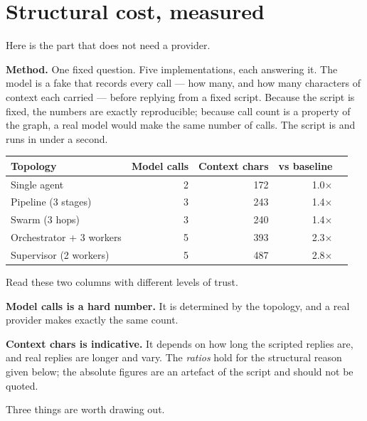 \section{Structural cost, measured}
\label{sec:structural-cost}

Here is the part that does not need a provider.

\textbf{Method.} One fixed question. Five implementations, each answering it. The
model is a fake that records every call --- how many, and how many characters of
context each carried --- before replying from a fixed script. Because the script
is fixed, the numbers are exactly reproducible; because call count is a property
of the graph, a real model would make the same number of calls. The script is
 and runs in under a second.

\begin{center}
\small
\begin{tabularx}{\linewidth}{@{}lrrrX@{}}
\toprule
\textbf{Topology} & \textbf{Model calls} & \textbf{Context chars} & \textbf{vs baseline} \\
\midrule
Single agent & 2 & 172 & 1.0$\times$ \\
Pipeline (3 stages) & 3 & 243 & 1.4$\times$ \\
Swarm (3 hops) & 3 & 240 & 1.4$\times$ \\
Orchestrator + 3 workers & 5 & 393 & 2.3$\times$ \\
Supervisor (2 workers) & 5 & 487 & 2.8$\times$ \\
\bottomrule
\end{tabularx}
\end{center}

\begin{warning}
Read these two columns with different levels of trust.

\textbf{Model calls is a hard number.} It is determined by the topology, and a
real provider makes exactly the same count.

\textbf{Context chars is indicative.} It depends on how long the scripted replies
are, and real replies are longer and vary. The \emph{ratios} hold for the
structural reason given below; the absolute figures are an artefact of the
script and should not be quoted.
\end{warning}

Three things are worth drawing out.

